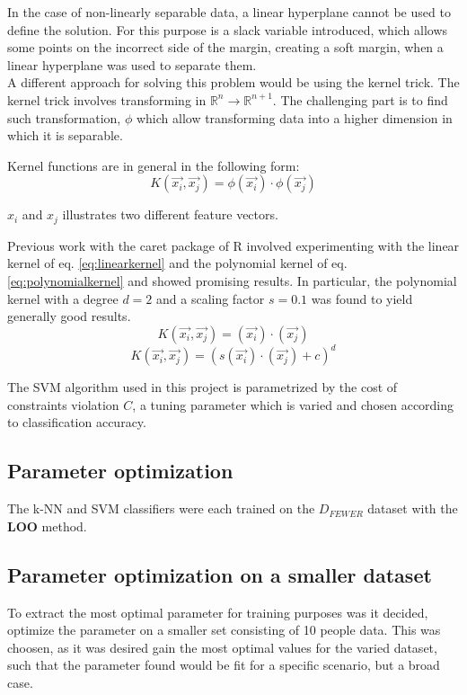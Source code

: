 In the case of non-linearly separable data,
a linear hyperplane cannot be used 
to define the solution. 
For this purpose is a slack variable introduced, which allows some points on the 
incorrect side of the margin, creating a soft margin, when a linear hyperplane 
was used to separate them.\\

A different approach for solving this problem would be using the kernel trick. 
The kernel trick involves transforming in $\mathbb{R}^n \rightarrow 
\mathbb{R}^{n+1}$. 
The challenging part is to find such transformation, $\phi$ which allow 
transforming data into a higher dimension in which it is separable. 

Kernel functions are in general in the following form:
\begin{equation}
K(\overrightarrow{x_i},\overrightarrow{x_j}) = \phi(\overrightarrow{x_i}) \cdot 
\phi(\overrightarrow{x_j}) 
\end{equation}

$x_i$ and $x_j$ illustrates two different feature vectors.

Previous work with the caret package of R
involved experimenting with the linear kernel of eq. \eqref{eq:linearkernel}
and the polynomial kernel of eq. \eqref{eq:polynomialkernel}
and showed promising results.
In particular, the polynomial kernel with a degree \(d=2\)
and a scaling factor \(s=0.1\) was found to yield generally good results.
\begin{equation}
K(\overrightarrow{x_i},\overrightarrow{x_j}) = (\overrightarrow{x_i}) \cdot 
(\overrightarrow{x_j})
\label{eq:linearkernel} 
\end{equation}
\begin{equation}
K(\overrightarrow{x_i},\overrightarrow{x_j}) = (s(\overrightarrow{x_i}) \cdot 
(\overrightarrow{x_j})+c)^d
\label{eq:polynomialkernel}
\end{equation}

The SVM algorithm used in this project is parametrized
by the cost of constraints violation \(C\),
a tuning parameter which is varied and chosen
according to classification accuracy.

\subsection{Parameter optimization}
The k-NN and SVM classifiers were each trained on the \(D_{FEWER}\) dataset with the \textbf{LOO} method.

\subsection{Parameter optimization on a smaller dataset}
To extract the most optimal parameter for training purposes was it decided, optimize the parameter on a smaller set consisting of 10 people data.  This was choosen, as it was desired gain the most optimal values for the varied dataset, such that the parameter found would be fit for a specific scenario, but a broad case. 

